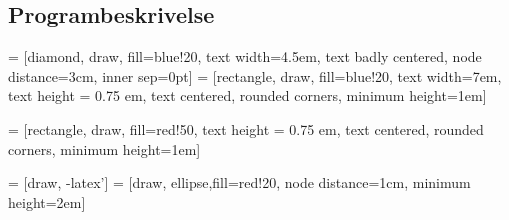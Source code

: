\subsection{Programbeskrivelse}
\usetikzlibrary{arrows,calc,positioning}

 = [diamond, draw, fill=blue!20, 
    text width=4.5em, text badly centered, node distance=3cm, inner sep=0pt]
 = [rectangle, draw, fill=blue!20, 
    text width=7em, text height = 0.75 em, text centered, rounded corners, minimum height=1em]

 = [rectangle, draw, fill=red!50, text height = 0.75 em, text centered, rounded corners, minimum height=1em]


 = [draw, -latex']
 = [draw, ellipse,fill=red!20, node distance=1cm,
    minimum height=2em]



